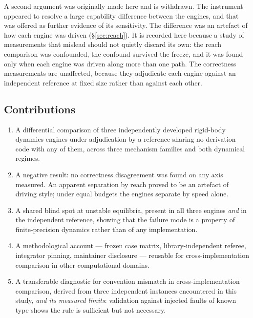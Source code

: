 \documentclass[review,12pt]{elsarticle}
\begin{document}
A second argument was originally made here and is withdrawn. The instrument
appeared to resolve a large capability difference between the engines, and
that was offered as further evidence of its sensitivity. The difference was
an artefact of how each engine was driven (\S\ref{sec:reach}). It is recorded
here because a study of measurements that mislead should not quietly discard
its own: the reach comparison was confounded, the confound survived the freeze,
and it was found only when each engine was driven along more than one path.
The correctness measurements are unaffected, because they adjudicate each
engine against an independent reference at fixed size rather than against
each other.

\subsection{Contributions}
\begin{enumerate}[leftmargin=1.6em,itemsep=0.3em]
  \item A differential comparison of three independently developed rigid-body
        dynamics engines under adjudication by a reference sharing no derivation
        code with any of them, across three mechanism families and both
        dynamical regimes.
  \item A negative result: no correctness disagreement was found on any axis
        measured. An apparent separation by reach proved to be an artefact of
        driving style; under equal budgets the engines separate by speed
        alone.
  \item A shared blind spot at unstable equilibria, present in all three engines
        \emph{and} in the independent reference, showing that the failure mode
        is a property of finite-precision dynamics rather than of any
        implementation.
  \item A methodological account --- frozen case matrix, library-independent
        referee, integrator pinning, maintainer disclosure --- reusable for
        cross-implementation comparison in other computational domains.
  \item A transferable diagnostic for convention mismatch in
        cross-imple\-men\-ta\-tion comparison, derived from three independent
        instances encountered in this study, \emph{and its measured limits}:
        validation against injected faults of known type shows the rule is
        sufficient but not necessary.
\end{enumerate}
\end{document}
